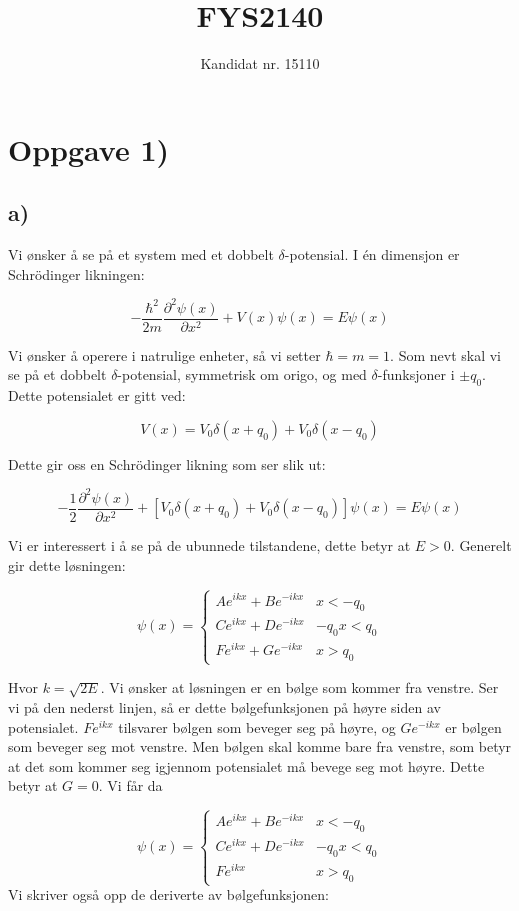 \documentclass[a4paper,norsk, 10pt]{article}
\title{FYS2140}
\author{Kandidat nr. 15110}
\numberwithin{equation}{section}
\begin{document}
\maketitle

\section{Oppgave 1)}
\subsection*{a)}
Vi ønsker å se på et system med et dobbelt $\delta$-potensial. I én dimensjon er Schrödinger likningen:

$$
-\frac{\hbar^2}{2m}\frac{\partial^2 \psi(x)}{\partial x^2} + V(x)\psi(x) = E\psi(x)
$$

Vi ønsker å operere i natrulige enheter, så vi setter $\hbar = m = 1$. Som nevt skal vi se på et dobbelt $\delta$-potensial, symmetrisk om origo, og med $\delta$-funksjoner i $\pm q_0$. Dette potensialet er gitt ved:

$$
V(x) = V_0\delta(x+q_0) + V_0\delta(x-q_0)
$$

Dette gir oss en Schrödinger likning som ser slik ut:

\begin{equation}
-\frac{1}{2}\frac{\partial^2 \psi(x)}{\partial x^2} + \left[V_0\delta(x+q_0) + V_0\delta(x-q_0)\right]\psi(x) = E\psi(x)
\label{eq:deltaSchr}
\end{equation}

Vi er interessert i å se på de ubunnede tilstandene, dette betyr at $E>0$. Generelt gir dette løsningen:

$$
\psi(x) = 
\begin{cases}
Ae^{ikx} + Be^{-ikx} & x< -q_0 \\
Ce^{ikx} + De^{-ikx} & -q_0x< q_0 \\
Fe^{ikx} + Ge^{-ikx} & x>q_0 
\end{cases}
$$

Hvor $k = \sqrt{2E}$. Vi ønsker at løsningen er en bølge som kommer fra venstre. Ser vi på den nederst linjen, så er dette bølgefunksjonen på høyre siden av potensialet. $Fe^{ikx}$ tilsvarer bølgen som beveger seg på høyre, og $Ge^{-ikx}$ er bølgen som beveger seg mot venstre. Men bølgen skal komme bare fra venstre, som betyr at det som kommer seg igjennom potensialet må bevege seg mot høyre. Dette betyr at $G = 0$. Vi får da

\begin{equation}
\psi(x) = 
\begin{cases}
Ae^{ikx} + Be^{-ikx} & x< -q_0 \\
Ce^{ikx} + De^{-ikx} & -q_0x< q_0 \\
Fe^{ikx} & x>q_0 
\end{cases}
\label{eq:psi}
\end{equation}
\newpage
Vi skriver også opp de deriverte av bølgefunksjonen:
\end{document}
